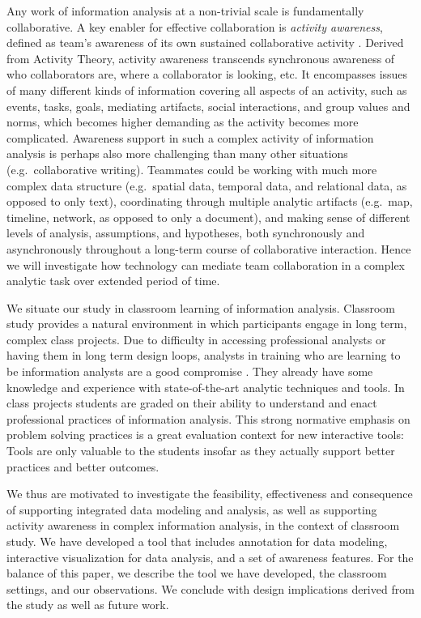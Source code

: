 Any work of information analysis at a non-trivial scale is fundamentally
collaborative. A key enabler for effective collaboration is
\emph{activity awareness}, defined as team's awareness of its own
sustained collaborative activity \autocite{Carroll2006}. Derived from
Activity Theory, activity awareness transcends synchronous awareness of
who collaborators are, where a collaborator is looking, etc. It
encompasses issues of many different kinds of information covering all
aspects of an activity, such as events, tasks, goals, mediating
artifacts, social interactions, and group values and norms, which
becomes higher demanding as the activity becomes more complicated.
Awareness support in such a complex activity of information analysis is
perhaps also more challenging than many other situations
(e.g.~collaborative writing). Teammates could be working with much more
complex data structure (e.g.~spatial data, temporal data, and relational
data, as opposed to only text), coordinating through multiple analytic
artifacts (e.g.~map, timeline, network, as opposed to only a document),
and making sense of different levels of analysis, assumptions, and
hypotheses, both synchronously and asynchronously throughout a long-term
course of collaborative interaction. Hence we will investigate how
technology can mediate team collaboration in a complex analytic task
over extended period of time.

We situate our study in classroom learning of information analysis.
Classroom study provides a natural environment in which participants
engage in long term, complex class projects. Due to difficulty in
accessing professional analysts or having them in long term design
loops, analysts in training who are learning to be information analysts
are a good compromise \autocite{Kang2011}. They already have some
knowledge and experience with state-of-the-art analytic techniques and
tools. In class projects students are graded on their ability to
understand and enact professional practices of information analysis.
This strong normative emphasis on problem solving practices is a great
evaluation context for new interactive tools: Tools are only valuable to
the students insofar as they actually support better practices and
better outcomes.

We thus are motivated to investigate the feasibility, effectiveness and
consequence of supporting integrated data modeling and analysis, as well
as supporting activity awareness in complex information analysis, in the
context of classroom study. We have developed a tool that includes
annotation for data modeling, interactive visualization for data
analysis, and a set of awareness features. For the balance of this
paper, we describe the tool we have developed, the classroom settings,
and our observations. We conclude with design implications derived from
the study as well as future work.
